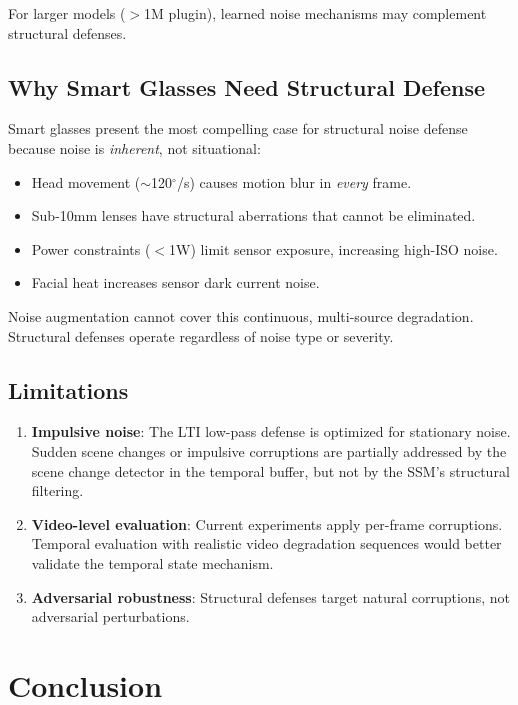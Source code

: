 \documentclass[conference]{IEEEtran}
\begin{document}
For larger models ($>$1M plugin), learned noise mechanisms may complement structural defenses.

\subsection{Why Smart Glasses Need Structural Defense}

Smart glasses present the most compelling case for structural noise defense because noise is \emph{inherent}, not situational:
\begin{itemize}
\item Head movement ($\sim$120$^\circ$/s) causes motion blur in \emph{every} frame.
\item Sub-10mm lenses have structural aberrations that cannot be eliminated.
\item Power constraints ($<$1W) limit sensor exposure, increasing high-ISO noise.
\item Facial heat increases sensor dark current noise.
\end{itemize}

Noise augmentation cannot cover this continuous, multi-source degradation. Structural defenses operate regardless of noise type or severity.

\subsection{Limitations}

\begin{enumerate}
\item \textbf{Impulsive noise}: The LTI low-pass defense is optimized for stationary noise. Sudden scene changes or impulsive corruptions are partially addressed by the scene change detector in the temporal buffer, but not by the SSM's structural filtering.
\item \textbf{Video-level evaluation}: Current experiments apply per-frame corruptions. Temporal evaluation with realistic video degradation sequences would better validate the temporal state mechanism.
\item \textbf{Adversarial robustness}: Structural defenses target natural corruptions, not adversarial perturbations.
\end{enumerate}

\section{Conclusion}
\end{document}
